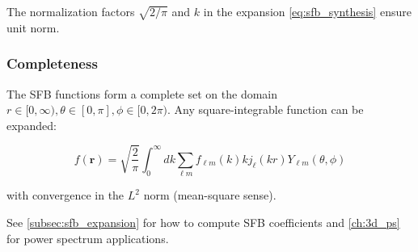The normalization factors $\sqrt{2/\pi}$ and $k$ in the expansion \cref{eq:sfb_synthesis} ensure unit norm.

\subsubsection{Completeness}

The SFB functions form a complete set on the domain $r \in [0, \infty), \theta \in [0, \pi], \phi \in [0, 2\pi)$. Any square-integrable function can be expanded:

\begin{equation}
f(\mathbf{r}) = \sqrt{\frac{2}{\pi}} \int_0^\infty dk \sum_{\ell m} f_{\ell m}(k) k j_\ell(kr) Y_{\ell m}(\theta, \phi)
\label{eq:sfb_complete}
\end{equation}

with convergence in the $L^2$ norm (mean-square sense).


See \cref{subsec:sfb_expansion} for how to compute SFB coefficients and \cref{ch:3d_ps} for power spectrum applications.
